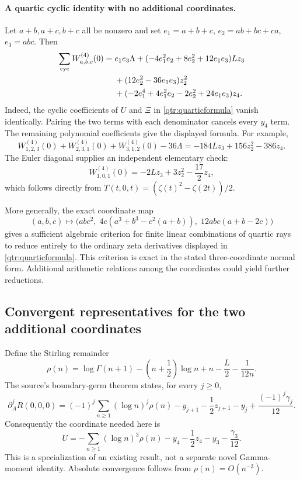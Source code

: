 \paragraph{A quartic cyclic identity with no additional coordinates.}
Let \(a+b,a+c,b+c\) all be nonzero and set
\(e_1=a+b+c\), \(e_2=ab+bc+ca\), \(e_3=abc\).
Then
\begin{align}
 \sum_{\mathrm{cyc}}W_{a,b,c}^{(4)}(0)
 ={}&e_1e_3\Lambda
 +(-4e_1^2e_2+8e_2^2+12e_1e_3)Lz_3\notag\\
 &+(12e_2^2-36e_1e_3)z_2^2\notag\\
 &+(-2e_1^4+4e_1^2e_2-2e_2^2+24e_1e_3)z_4.
 \label{qtr:cyclicquartic}
\end{align}
Indeed, the cyclic coefficients of \(U\) and \(\Xi\) in
\eqref{qtr:quarticformula} vanish identically. Pairing the two
terms with each denominator cancels every \(y_4\) term.
The remaining polynomial coefficients give the displayed formula.
For example,
\begin{equation}\label{qtr:example}
 W_{1,2,3}^{(4)}(0)+W_{2,3,1}^{(4)}(0)
 +W_{3,1,2}^{(4)}(0)-36\Lambda
 =-184Lz_3+156z_2^2-386z_4.
\end{equation}
The Euler diagonal supplies an independent elementary check:
\[
 W_{1,0,1}^{(4)}(0)
 =-2Lz_3+3z_2^2-\frac{17}{2}z_4,
\]
which follows directly from
\(T(t,0,t)=(\zeta(t)^2-\zeta(2t))/2\).

More generally, the exact coordinate map
\[
 (a,b,c)\longmapsto
 \bigl(abc^2,\;
 4c(a^3+b^3-c^2(a+b)),\;
 12abc(a+b-2c)\bigr)
\]
gives a sufficient algebraic criterion for finite linear
combinations of quartic rays to reduce entirely to the ordinary
zeta derivatives displayed in \eqref{qtr:quarticformula}.
This criterion is exact in the stated three-coordinate normal
form. Additional arithmetic relations among the coordinates
could yield further reductions.

\subsection{Convergent representatives for the two additional coordinates}

Define the Stirling remainder
\[
 \rho(n)=\log\Gamma(n+1)-\left(n+\frac12\right)\log n+n
                 -\frac L2-\frac1{12n}.
\]
The source's boundary-germ theorem states, for every \(j\ge0\),
\[
 \partial_A^jR(0,0,0)
 =(-1)^j\sum_{n\ge1}(\log n)^j\rho(n)
 -y_{j+1}-\frac12z_{j+1}-y_j
 +\frac{(-1)^j\gamma_j}{12}.
\]
Consequently the coordinate needed here is
\begin{equation}\label{qtr:U}
 U=-\sum_{n\ge1}(\log n)^3\rho(n)
                  -y_4-\frac12z_4-y_3-\frac{\gamma_3}{12}.
\end{equation}
This is a specialization of an existing result, not a separate
novel Gamma-moment identity. Absolute convergence follows from
\(\rho(n)=O(n^{-3})\).

